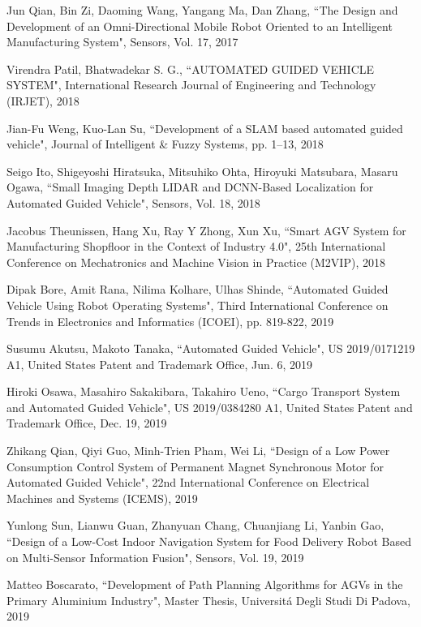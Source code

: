 \begin{thebibliography}{}
 Jun Qian, Bin Zi, Daoming Wang, Yangang Ma, Dan Zhang, ``The Design and Development of an Omni-Directional Mobile Robot Oriented to an Intelligent Manufacturing System", Sensors, Vol. 17, 2017

 Virendra Patil, Bhatwadekar S. G., ``AUTOMATED GUIDED VEHICLE SYSTEM", International Research Journal of Engineering and Technology (IRJET), 2018

 Jian-Fu Weng, Kuo-Lan Su, ``Development of a SLAM based automated guided vehicle", Journal of Intelligent \& Fuzzy Systems, pp. 1–13, 2018

 Seigo Ito, Shigeyoshi Hiratsuka, Mitsuhiko Ohta, Hiroyuki Matsubara, Masaru Ogawa, ``Small Imaging Depth LIDAR and DCNN-Based Localization for Automated Guided Vehicle", Sensors, Vol. 18, 2018

 Jacobus Theunissen, Hang Xu,  Ray Y Zhong, Xun Xu, ``Smart AGV System for Manufacturing Shopfloor in the Context of Industry 4.0", 25th International Conference on Mechatronics and Machine Vision in Practice (M2VIP), 2018

 Dipak Bore, Amit Rana, Nilima Kolhare, Ulhas Shinde, ``Automated Guided Vehicle Using Robot Operating Systems", Third International Conference on Trends in Electronics and Informatics (ICOEI), pp. 819-822, 2019

 Susumu Akutsu, Makoto Tanaka, ``Automated Guided Vehicle", US 2019/0171219 A1, United States Patent and Trademark Office, Jun. 6, 2019

 Hiroki Osawa, Masahiro Sakakibara, Takahiro Ueno, ``Cargo Transport System and Automated Guided Vehicle", US 2019/0384280 A1, United States Patent and Trademark Office, Dec. 19, 2019

 Zhikang Qian, Qiyi Guo, Minh-Trien Pham, Wei Li, ``Design of a Low Power Consumption Control System of Permanent Magnet Synchronous Motor for Automated Guided Vehicle", 22nd International Conference on Electrical Machines and Systems (ICEMS), 2019

 Yunlong Sun, Lianwu Guan, Zhanyuan Chang, Chuanjiang Li, Yanbin Gao, ``Design of a Low-Cost Indoor Navigation System for Food Delivery Robot Based on Multi-Sensor Information Fusion", Sensors, Vol. 19, 2019

 Matteo Boscarato, ``Development of Path Planning Algorithms for AGVs in the Primary Aluminium Industry", Master Thesis, Universit\'{a} Degli Studi Di Padova, 2019


\end{thebibliography}
